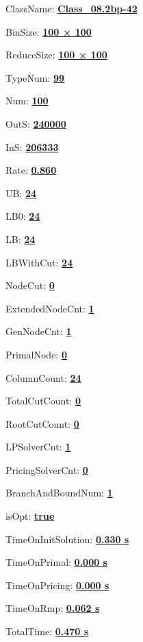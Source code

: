 \documentclass[11pt]{article}
\begin{document}
\pagestyle{empty}


ClassName: \underline{\textbf{Class_08.2bp-42}}
\par
BinSize: \underline{\textbf{100 × 100}}
\par
ReduceSize: \underline{\textbf{100 × 100}}
\par
TypeNum: \underline{\textbf{99}}
\par
Num: \underline{\textbf{100}}
\par
OutS: \underline{\textbf{240000}}
\par
InS: \underline{\textbf{206333}}
\par
Rate: \underline{\textbf{0.860}}
\par
UB: \underline{\textbf{24}}
\par
LB0: \underline{\textbf{24}}
\par
LB: \underline{\textbf{24}}
\par
LBWithCut: \underline{\textbf{24}}
\par
NodeCut: \underline{\textbf{0}}
\par
ExtendedNodeCnt: \underline{\textbf{1}}
\par
GenNodeCnt: \underline{\textbf{1}}
\par
PrimalNode: \underline{\textbf{0}}
\par
ColumnCount: \underline{\textbf{24}}
\par
TotalCutCount: \underline{\textbf{0}}
\par
RootCutCount: \underline{\textbf{0}}
\par
LPSolverCnt: \underline{\textbf{1}}
\par
PricingSolverCnt: \underline{\textbf{0}}
\par
BranchAndBoundNum: \underline{\textbf{1}}
\par
isOpt: \underline{\textbf{true}}
\par
TimeOnInitSolution: \underline{\textbf{0.330 s}}
\par
TimeOnPrimal: \underline{\textbf{0.000 s}}
\par
TimeOnPricing: \underline{\textbf{0.000 s}}
\par
TimeOnRmp: \underline{\textbf{0.062 s}}
\par
TotalTime: \underline{\textbf{0.470 s}}
\par
\newpage


\end{document}
